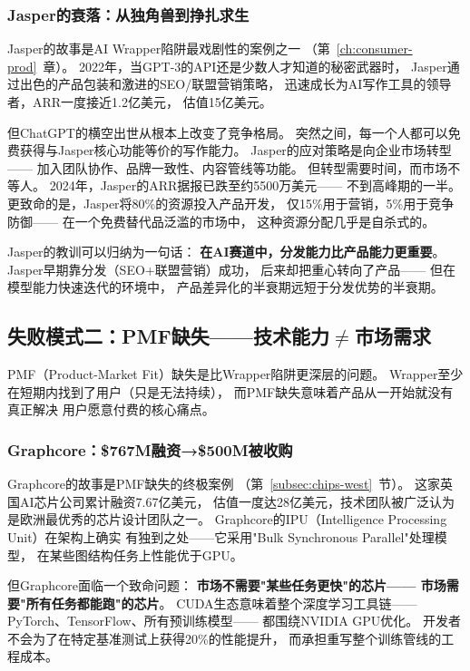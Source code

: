 \subsubsection{Jasper的衰落：从独角兽到挣扎求生}
Jasper的故事是AI Wrapper陷阱最戏剧性的案例之一
（第~\ref{ch:consumer-prod}~章）。
2022年，当GPT-3的API还是少数人才知道的秘密武器时，
Jasper通过出色的产品包装和激进的SEO/联盟营销策略，
迅速成长为AI写作工具的领导者，ARR一度接近1.2亿美元，
估值15亿美元。

但ChatGPT的横空出世从根本上改变了竞争格局。
突然之间，每一个人都可以免费获得与Jasper核心功能等价的写作能力。
Jasper的应对策略是向企业市场转型——
加入团队协作、品牌一致性、内容管线等功能。
但转型需要时间，而市场不等人。
2024年，Jasper的ARR据报已跌至约5500万美元——
不到高峰期的一半。
更致命的是，Jasper将80\%的资源投入产品开发，
仅15\%用于营销，5\%用于竞争防御——
在一个免费替代品泛滥的市场中，
这种资源分配几乎是自杀式的。

Jasper的教训可以归纳为一句话：
\textbf{在AI赛道中，分发能力比产品能力更重要}。
Jasper早期靠分发（SEO+联盟营销）成功，
后来却把重心转向了产品——
但在模型能力快速迭代的环境中，
产品差异化的半衰期远短于分发优势的半衰期。


\subsection{失败模式二：PMF缺失——技术能力$\neq$市场需求}

PMF（Product-Market Fit）缺失是比Wrapper陷阱更深层的问题。
Wrapper至少在短期内找到了用户（只是无法持续），
而PMF缺失意味着产品从一开始就没有真正解决
用户愿意付费的核心痛点。

\subsubsection{Graphcore：\$767M融资→\$500M被收购}
Graphcore的故事是PMF缺失的终极案例
（第~\ref{subsec:chips-west}~节）。
这家英国AI芯片公司累计融资7.67亿美元，
估值一度达28亿美元，技术团队被广泛认为是欧洲最优秀的芯片设计团队之一。
Graphcore的IPU（Intelligence Processing Unit）在架构上确实
有独到之处——它采用"Bulk Synchronous Parallel"处理模型，
在某些图结构任务上性能优于GPU。

但Graphcore面临一个致命问题：
\textbf{市场不需要"某些任务更快"的芯片——
市场需要"所有任务都能跑"的芯片}。
CUDA生态意味着整个深度学习工具链——
PyTorch、TensorFlow、所有预训练模型——
都围绕NVIDIA GPU优化。
开发者不会为了在特定基准测试上获得20\%的性能提升，
而承担重写整个训练管线的工程成本。

